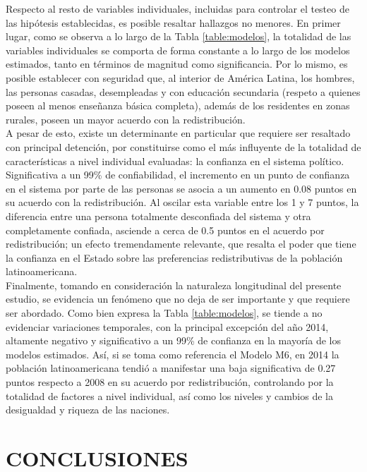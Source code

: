 \documentclass[12pt,letterpaper]{article}
\begin{document}
Respecto al resto de variables individuales, incluidas para controlar el testeo de las hipótesis establecidas, es posible resaltar hallazgos no menores. En primer lugar, como se observa a lo largo de la Tabla \ref{table:modelos}, la totalidad de las variables individuales se comporta de forma constante a lo largo de los modelos estimados, tanto en términos de magnitud como significancia. Por lo mismo, es posible establecer con seguridad que, al interior de América Latina, los hombres, las personas casadas, desempleadas y con educación secundaria (respeto a quienes poseen al menos enseñanza básica completa), además de los residentes en zonas rurales, poseen un mayor acuerdo con la redistribución.\\

A pesar de esto, existe un determinante en particular que requiere ser resaltado con principal detención, por constituirse como el más influyente de la totalidad de características a nivel individual evaluadas: la confianza en el sistema político. Significativa a un 99\% de confiabilidad, el incremento en un punto de confianza en el sistema por parte de las personas se asocia a un aumento en 0.08 puntos en su acuerdo con la redistribución. Al oscilar esta variable entre los 1 y 7 puntos, la diferencia entre una persona totalmente desconfiada del sistema y otra completamente confiada, asciende a cerca de 0.5 puntos en el acuerdo por redistribución; un efecto tremendamente relevante, que resalta el poder que tiene la confianza en el Estado sobre las preferencias redistributivas de la población latinoamericana.\\

Finalmente, tomando en consideración la naturaleza longitudinal del presente estudio, se evidencia un fenómeno que no deja de ser importante y que requiere ser abordado. Como bien expresa la Tabla \ref{table:modelos}, se tiende a no evidenciar variaciones temporales, con la principal excepción del año 2014, altamente negativo y significativo a un 99\% de confianza en la mayoría de los modelos estimados. Así, si se toma como referencia el Modelo M6, en 2014 la población latinoamericana tendió a manifestar una baja significativa de 0.27 puntos respecto a 2008 en su acuerdo por redistribución, controlando por la totalidad de factores a nivel individual, así como los niveles y cambios de la desigualdad y riqueza de las naciones.

\newpage

\section{CONCLUSIONES}
\end{document}
